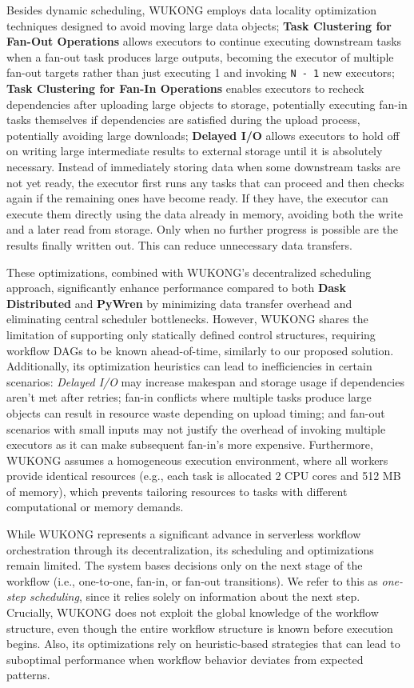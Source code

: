 \begin{itemize}
Besides dynamic scheduling, WUKONG employs data locality optimization techniques designed to avoid moving large data objects; \textbf{Task Clustering for Fan-Out Operations} allows executors to continue executing downstream tasks when a fan-out task produces large outputs, becoming the executor of multiple fan-out targets rather than just executing 1 and invoking \texttt{N - 1} new executors; \textbf{Task Clustering for Fan-In Operations} enables executors to recheck dependencies after uploading large objects to storage, potentially executing fan-in tasks themselves if dependencies are satisfied during the upload process, potentially avoiding large downloads; \textbf{Delayed I/O} allows executors to hold off on writing large intermediate results to external storage until it is absolutely necessary. Instead of immediately storing data when some downstream tasks are not yet ready, the executor first runs any tasks that can proceed and then checks again if the remaining ones have become ready. If they have, the executor can execute them directly using the data already in memory, avoiding both the write and a later read from storage. Only when no further progress is possible are the results finally written out. This can reduce unnecessary data transfers.

These optimizations, combined with WUKONG's decentralized scheduling approach, significantly enhance performance compared to both \textbf{Dask Distributed} and \textbf{PyWren} by minimizing data transfer overhead and eliminating central scheduler bottlenecks. However, WUKONG shares the limitation of supporting only statically defined control structures, requiring workflow DAGs to be known ahead-of-time, similarly to our proposed solution. Additionally, its optimization heuristics can lead to inefficiencies in certain scenarios: \textit{Delayed I/O} may increase makespan and storage usage if dependencies aren't met after retries; fan-in conflicts where multiple tasks produce large objects can result in resource waste depending on upload timing; and fan-out scenarios with small inputs may not justify the overhead of invoking multiple executors as it can make subsequent fan-in's more expensive. Furthermore, WUKONG assumes a homogeneous execution environment, where all workers provide identical resources (e.g., each task is allocated 2 CPU cores and 512 MB of memory), which prevents tailoring resources to tasks with different computational or memory demands.

While WUKONG represents a significant advance in serverless workflow orchestration through its decentralization, its scheduling and optimizations remain limited. The system bases decisions only on the next stage of the workflow (i.e., one-to-one, fan-in, or fan-out transitions). We refer to this as \textit{one-step scheduling}, since it relies solely on information about the next step. Crucially, WUKONG does not exploit the global knowledge of the workflow structure, even though the entire workflow structure is known before execution begins. Also, its optimizations rely on heuristic-based strategies that can lead to suboptimal performance when workflow behavior deviates from expected patterns.

\end{itemize}

